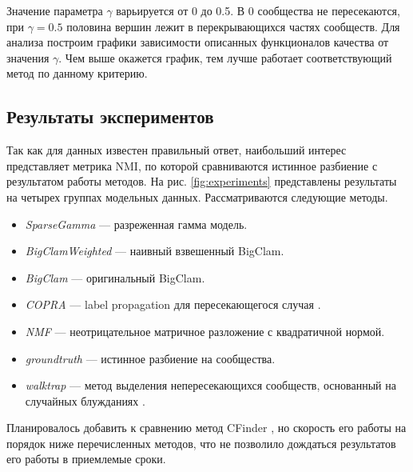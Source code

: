 \documentclass{ITaSconf}
\begin{document}
	Значение параметра $\gamma$ варьируется от 0 до 0.5. 
	В 0 сообщества не пересекаются, при $\gamma=0.5$ половина вершин лежит в перекрывающихся частях сообществ.
	Для анализа построим графики зависимости описанных функционалов качества от значения $\gamma$. 
	Чем выше окажется график, тем лучше работает соответствующий метод по данному критерию.
	
	\subsection{Результаты экспериментов}
	
	Так как для данных известен правильный ответ, наибольший интерес представляет метрика NMI, по которой сравниваются истинное разбиение с результатом работы методов. На рис. \ref{fig:experiments} представлены результаты на четырех группах модельных данных.
	Рассматриваются следующие методы.
	
	\begin{itemize}[label={}, leftmargin=*]
		\item \textit{SparseGamma} --- разреженная гамма модель.
		\item \textit{BigClamWeighted} --- наивный взвешенный BigClam.
		\item \textit{BigClam} --- оригинальный BigClam.
		\item \textit{COPRA} --- label propagation для пересекающегося случая \cite{gregory2010finding}.
		\item \textit{NMF} --- неотрицательное матричное разложение с квадратичной нормой.
		\item \textit{groundtruth} --- истинное разбиение на сообщества.
		\item \textit{walktrap} --- метод выделения непересекающихся сообществ, основанный на случайных блужданиях \cite{Pascal05}.
	\end{itemize}
	Планировалось добавить к сравнению метод CFinder \cite{palla2005uncovering}, но скорость его работы на порядок ниже перечисленных методов, что не позволило дождаться результатов его работы в приемлемые сроки.
	
\end{document}
